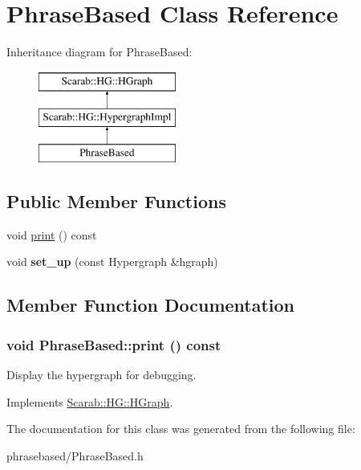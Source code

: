 \hypertarget{classPhraseBased}{
\section{PhraseBased Class Reference}
\label{classPhraseBased}
}
Inheritance diagram for PhraseBased:\begin{figure}[H]
\begin{center}
\leavevmode
\includegraphics[height=3cm]{classPhraseBased}
\end{center}
\end{figure}
\subsection*{Public Member Functions}
\begin{DoxyCompactItemize}
\item 
void \hyperlink{classPhraseBased_aafc2997b58b3698fed7cb5a1f6f269c6}{print} () const 
\item 
\hypertarget{classPhraseBased_a3883660c72be6ce8daab08f368317853}{
void {\bfseries set\_\-up} (const Hypergraph \&hgraph)}
\label{classPhraseBased_a3883660c72be6ce8daab08f368317853}

\end{DoxyCompactItemize}


\subsection{Member Function Documentation}
\hypertarget{classPhraseBased_aafc2997b58b3698fed7cb5a1f6f269c6}{
\subsubsection[{print}]{\setlength{\rightskip}{0pt plus 5cm}void PhraseBased::print () const}}
\label{classPhraseBased_aafc2997b58b3698fed7cb5a1f6f269c6}
Display the hypergraph for debugging. 

Implements \hyperlink{classScarab_1_1HG_1_1HGraph_ab5aa11c932b28864b56f28e0babbc1c1}{Scarab::HG::HGraph}.



The documentation for this class was generated from the following file:\begin{DoxyCompactItemize}
\item 
phrasebased/PhraseBased.h\end{DoxyCompactItemize}
